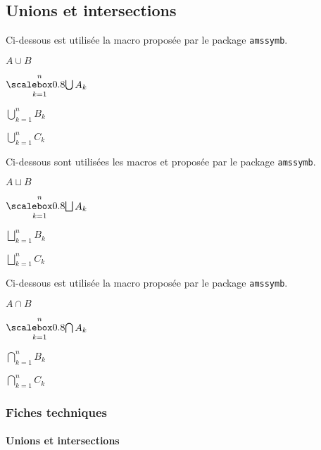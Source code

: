 \documentclass[12pt,a4paper]{article}
\begin{document}

\subsection{Unions et intersections}


Ci-dessous est utilisée la macro  proposée par le package \verb+amssymb+.

\begin{latexex}
$A \cup B$

$\dcup_{k=1}^{n} A_k$

$\bigcup_{k=1}^{n} B_k$

$\displaystyle \bigcup_{k=1}^{n} C_k$
\end{latexex}





Ci-dessous sont utilisées les macros  et  proposée par le package \verb+amssymb+.

\begin{latexex}
$A\sqcup B$

$\dsqcup_{k=1}^{n} A_k$

$\bigsqcup_{k=1}^{n} B_k$

$\displaystyle \bigsqcup_{k=1}^{n} C_k$
\end{latexex}





Ci-dessous est utilisée la macro  proposée par le package \verb+amssymb+.

\begin{latexex}
$A \cap B$

$\dcap_{k=1}^{n} A_k$

$\bigcap_{k=1}^{n} B_k$

$\displaystyle \bigcap_{k=1}^{n} C_k$
\end{latexex}




\subsubsection{Fiches techniques}

\paragraph{Unions et intersections}



\end{document}
